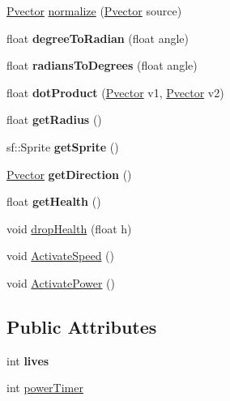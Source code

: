 \begin{DoxyCompactItemize}
\item 
\hyperlink{class_pvector}{Pvector} \hyperlink{class_player_aa43e7eb990573c6a6e78ba17b60a19c1}{normalize} (\hyperlink{class_pvector}{Pvector} source)
\item 
float {\bfseries degree\+To\+Radian} (float angle)\hypertarget{class_player_ac0c8e4e69ee942244032003276f0ddc7}{}\label{class_player_ac0c8e4e69ee942244032003276f0ddc7}

\item 
float {\bfseries radians\+To\+Degrees} (float angle)\hypertarget{class_player_a2fb9437794be127ab141387bd96c2d56}{}\label{class_player_a2fb9437794be127ab141387bd96c2d56}

\item 
float {\bfseries dot\+Product} (\hyperlink{class_pvector}{Pvector} v1, \hyperlink{class_pvector}{Pvector} v2)\hypertarget{class_player_a92ee7aa8a114dec6307697b727116e95}{}\label{class_player_a92ee7aa8a114dec6307697b727116e95}

\item 
float {\bfseries get\+Radius} ()\hypertarget{class_player_af2d2f95afa14ee652f5f47b7bc3ddca1}{}\label{class_player_af2d2f95afa14ee652f5f47b7bc3ddca1}

\item 
sf\+::\+Sprite {\bfseries get\+Sprite} ()\hypertarget{class_player_aabef659f696be314cdb705a1ce77ec2a}{}\label{class_player_aabef659f696be314cdb705a1ce77ec2a}

\item 
\hyperlink{class_pvector}{Pvector} {\bfseries get\+Direction} ()\hypertarget{class_player_aed591232c705afa85e8839a4c62340fd}{}\label{class_player_aed591232c705afa85e8839a4c62340fd}

\item 
float {\bfseries get\+Health} ()\hypertarget{class_player_a2d1542816021d46bf0d007d57a2c7291}{}\label{class_player_a2d1542816021d46bf0d007d57a2c7291}

\item 
void \hyperlink{class_player_a13c96708a445b4d679a6bedad4cc1b9d}{drop\+Health} (float h)
\item 
void \hyperlink{class_player_a9cc44c591dbf061567919aa5e29a0ceb}{Activate\+Speed} ()
\item 
void \hyperlink{class_player_ad1f63604e673673c8919a29321aec6f4}{Activate\+Power} ()
\end{DoxyCompactItemize}
\subsection*{Public Attributes}
\begin{DoxyCompactItemize}
\item 
int {\bfseries lives}\hypertarget{class_player_ab3300fa23175647f3ff50311dd2a7e04}{}\label{class_player_ab3300fa23175647f3ff50311dd2a7e04}

\item 
int \hyperlink{class_player_a04fce59d939c7644cf08ca86441e7285}{power\+Timer}
\end{DoxyCompactItemize}
